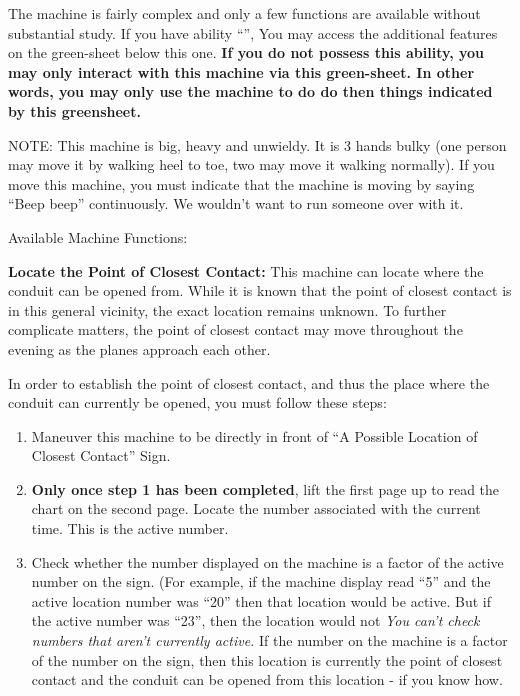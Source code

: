 \documentclass[green]{elementals}
\begin{document}
\name{\gConduitCover{}}


The machine is fairly complex and only a few functions are available without substantial study. If you have ability ``\aWorkConduit{}'', You may access the additional features on the green-sheet below this one. {\bf If you do not possess this ability, you may only interact with this machine via this green-sheet. In other words, you may only use the machine to do do then things indicated by this greensheet.}

NOTE: This machine is big, heavy and unwieldy. It is 3 hands bulky (one person may move it by walking heel to toe, two may move it walking normally). If you move this machine, you must indicate that the machine is moving by saying ``Beep beep'' continuously. We wouldn't want to run someone over with it.


{\large Available Machine Functions:}


{\bf Locate the Point of Closest Contact:}
This machine can locate where the conduit can be opened from. While it is known that the point of closest contact is in this general vicinity, the exact location remains unknown. To further complicate matters, the point of closest contact may move throughout the evening as the planes approach each other.

In order to establish the point of closest contact, and thus the place where the conduit can currently be opened, you must follow these steps:
\begin{enumerate}
  \item Maneuver this machine to be directly in front of ``A Possible Location of Closest Contact'' Sign.
  \item {\bf Only once step 1 has been completed}, lift the first page up to read the chart on the second page. Locate the number associated with the current time. This is the active number.
  \item Check whether the number displayed on the machine is a factor of the active number on the sign. (For example, if the machine display read ``5'' and the active location number was ``20'' then that location would be active. But if the active number was ``23'', then the location would not   \emph{You can't check numbers that aren't currently active.} If the number on the machine is a factor of the number on the sign, then this location is currently the point of closest contact and the conduit can be opened from this location - if you know how.
\end{enumerate}
\end{document}
